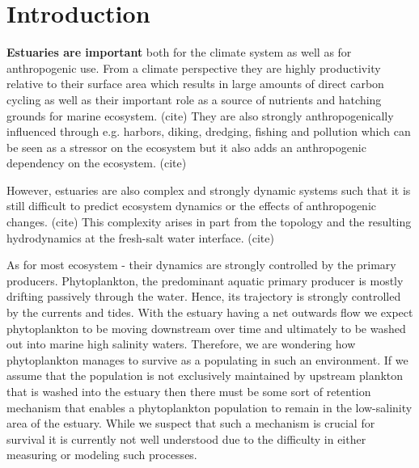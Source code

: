 
\section*{Introduction}


\textbf{Estuaries are important} both for the climate system as well as for anthropogenic use.
From a climate perspective they are highly productivity relative to their surface area 
which results in large amounts of direct carbon cycling 
as well as their important role as a source of nutrients and hatching grounds for marine ecosystem. (cite)
They are also strongly anthropogenically influenced through e.g. harbors, diking, dredging, fishing and pollution which can be seen as a stressor on the ecosystem but it also adds an anthropogenic dependency on the ecosystem. (cite)

However, estuaries are also complex and strongly dynamic systems such that it is still difficult to predict ecosystem dynamics or the effects of anthropogenic changes. (cite)
This complexity arises in part from the topology and the resulting hydrodynamics at the fresh-salt water interface. (cite)

As for most ecosystem - their dynamics are strongly controlled by the primary producers.
Phytoplankton, the 	predominant aquatic primary producer is mostly drifting passively through the water.
Hence, its trajectory is strongly controlled by the currents and tides.
With the estuary having a net outwards flow we expect phytoplankton to be moving
 downstream over time and ultimately to be washed out into marine high salinity waters.
Therefore, we are wondering how phytoplankton manages to survive as a populating in such an environment.
If we assume that the population is not exclusively maintained by upstream plankton that is washed into the estuary
 then there must be some sort of retention mechanism that enables a phytoplankton population to remain in the low-salinity area of the estuary.
While we suspect that such a mechanism is crucial for survival it is currently not well understood 
due to the difficulty in either measuring or modeling such processes.



